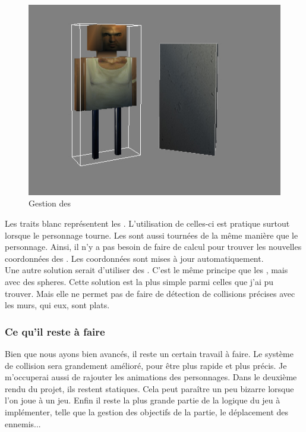 \documentclass{article}
\begin{document}
\begin{figure}[h]
\begin{center}
\includegraphics[scale=0.7]{BoundingBox.jpg}
\caption{Gestion des }
\end{center}
\end{figure}

Les traits blanc représentent les . L'utilisation de celles-ci est pratique surtout lorsque le personnage tourne. Les  sont aussi tournées de la même manière que le personnage. Ainsi, il n'y a pas besoin de faire de calcul pour trouver les nouvelles coordonnées des . Les coordonnées sont mises à jour automatiquement. \\
Une autre solution serait d'utiliser des . C'est le même principe que les , mais avec des spheres. Cette solution est la plus simple parmi celles que j'ai pu trouver. Mais elle ne permet pas de faire de détection de collisions précises avec les murs, qui eux, sont plats.

\subsubsection{Ce qu'il reste à faire}

Bien que nous ayons bien avancés, il reste un certain travail à faire. Le système de collision sera grandement amélioré, pour être plus rapide et plus précis. Je m'occuperai aussi de rajouter les animations des personnages. Dans le deuxième rendu du projet, ils restent statiques. Cela peut paraître un peu bizarre lorsque l'on joue à un jeu. Enfin il reste la plus grande partie de la logique du jeu à implémenter, telle que la gestion des objectifs de la partie, le déplacement des ennemis...
\end{document}
